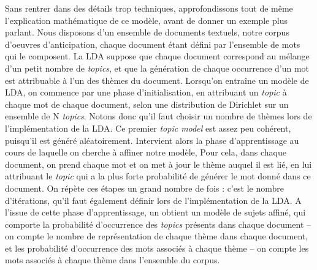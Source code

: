 \documentclass[letterpaper,portrait,12pt]{article}
\begin{document}
	Sans rentrer dans des d\'{e}tails trop techniques, approfondissons tout de m\^{e}me l'explication math\'{e}matique de ce mod\`{e}le, avant de donner un exemple plus parlant. Nous disposons d'un ensemble de documents textuels, notre corpus d'oeuvres d'anticipation, chaque document \'{e}tant d\'{e}fini par l'ensemble de mots qui le composent. La LDA suppose que chaque document correspond au m\'{e}lange d'un petit nombre de \emph{topics}, et que la g\'{e}n\'{e}ration de chaque occurrence d'un mot est attribuable \`{a} l'un des th\`{e}mes du document. Lorsqu'on entra\^{i}ne un mod\`{e}le de LDA, on commence par une phase d'initialisation, en attribuant un \emph{topic} \`{a} chaque mot de chaque document, selon une distribution de Dirichlet sur un ensemble de N \emph{topics}. Notons donc qu'il faut choisir un nombre de th\`{e}mes lors de l'impl\'{e}mentation de la LDA. Ce premier \emph{topic model} est assez peu coh\'{e}rent, puisqu'il est g\'{e}n\'{e}r\'{e} al\'{e}atoirement. Intervient alors la phase d'apprentissage au cours de laquelle on cherche \`{a} affiner notre mod\`{e}le, Pour cela, dans chaque document, on prend chaque mot et on met \`{a} jour le th\`{e}me auquel il est li\'{e}, en lui attribuant le \emph{topic }qui a la plus forte probabilit\'{e} de g\'{e}n\'{e}rer le mot donn\'{e} dans ce document. On r\'{e}p\`{e}te ces \'{e}tapes un grand nombre de fois : c'est le nombre d'it\'{e}rations, qu'il faut \'{e}galement d\'{e}finir lors de l'impl\'{e}mentation de la LDA. A l'issue de cette phase d'apprentissage, un obtient un mod\`{e}le de sujets affin\'{e}, qui comporte la probabilit\'{e} d'occurrence des \emph{topics }pr\'{e}sents dans chaque document -- on compte le nombre de repr\'{e}sentation de chaque th\`{e}me dans chaque document, et les probabilit\'{e} d'occurrence des mots associ\'{e}s \`{a} chaque th\`{e}me -- on compte les mots associ\'{e}s \`{a} chaque th\`{e}me dans l'ensemble du corpus.
\end{document}
